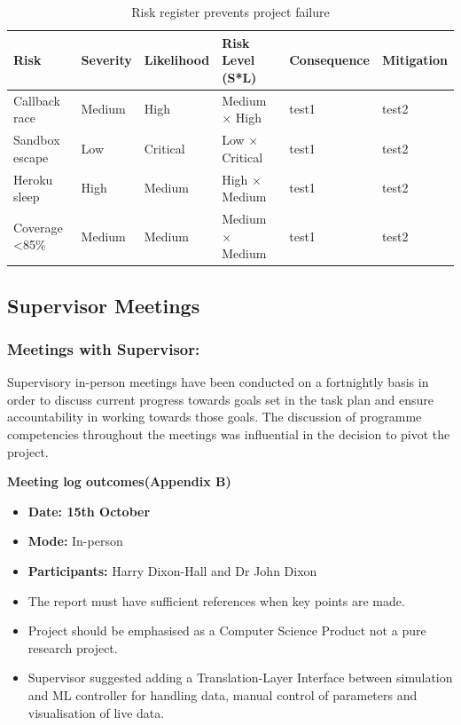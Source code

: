 \documentclass{article}
\begin{document}
\begin{table}[H]
\centering
\begin{tabular}{|l|l|l|l|l|l|}
\hline
\textbf{Risk} & \textbf{Severity} & \textbf{Likelihood} & 
\textbf{Risk Level (S*L)} & \textbf{Consequence} & \textbf{Mitigation}\\ 
\hline
Callback race  & Medium & High     & Medium $\times$ High   & test1 & test2 \\
Sandbox escape & Low    & Critical & Low $\times$ Critical  & test1 & test2 \\
Heroku sleep   & High   & Medium   & High $\times$ Medium   & test1 & test2\\
Coverage <85\% & Medium & Medium   & Medium $\times$ Medium & test1 & test2 \\
\hline
\end{tabular}
\caption{Risk register prevents project failure}
\end{table}




\subsection{Supervisor Meetings}
\subsubsection{Meetings with Supervisor:} Supervisory in-person meetings have been conducted on a fortnightly basis in order to discuss current progress towards goals set in the task plan and ensure accountability in working towards those goals. The discussion of programme competencies throughout the meetings was influential in the decision to pivot the project.

\textbf{Meeting log outcomes(Appendix B)}
\begin{itemize}
\item \textbf{Date: 15th October}
\item \textbf{Mode:} In-person
\item \textbf{Participants:} Harry Dixon-Hall and Dr John Dixon
\item The report must have sufficient references when key points are made.
\item Project should be emphasised as a Computer Science Product not a pure research project.
\item Supervisor suggested adding a Translation-Layer Interface between simulation and ML controller for handling data, manual control of parameters and visualisation of live data.
\end{itemize}
\end{document}

